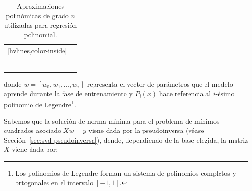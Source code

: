 \begin{table}[h]
    \centering
    \begin{NiceTabular}{c c}[hvlines,color-inside]
         &  \\ 
        
         &  \\ \\

         &   \\ \\

         &   \\ \\

    \end{NiceTabular}
    \caption{Aproximaciones polinómicas de grado $n$ utilizadas para regresión polinomial.}\label{tabla:aproximaciones-polinomicas}
\end{table}

donde $w = [w_0, w_1, \ldots, w_n]$ representa el vector de parámetros que el modelo aprende durante la fase de entrenamiento y $P_i(x)$ hace referencia al $i$-ésimo polinomio de Legendre\footnote{Los polinomios de Legendre forman un sistema de polinomios completos y ortogonales en el intervalo $[-1, 1]$.}.


Sabemos que la solución de norma mínima para el problema de mínimos cuadrados asociado $Xw=y$ viene dada por la pseudoinversa (véase Sección~\ref{sec:svd-pseudoinversa}), donde, dependiendo de la base elegida, la matriz $X$ viene dada por:

